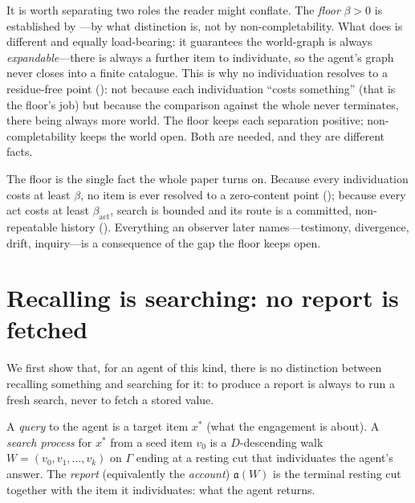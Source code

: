 \documentclass[11pt,twocolumn,a4paper]{article}
\newcommand{\Gph}{\Gamma}
\newcommand{\flo}{\beta}
\newcommand{\Walk}{W}
\newcommand{\acct}{\mathfrak{a}}   %
\newcommand{\dem}{D}
\begin{document}
\begin{remark}
\label{rem:noncompletable-role}
It is worth separating two roles the reader might conflate. The
\emph{floor} $\flo>0$ is established by ---by what
distinction is, not by non-completability. What
 does is different and equally load-bearing: it
guarantees the world-graph is always \emph{expandable}---there is always a
further item to individuate, so the agent's graph never closes into a finite
catalogue. This is why no individuation resolves to a residue-free point
(): not because each individuation ``costs something''
(that is the floor's job) but because the comparison against the whole never
terminates, there being always more world. The floor keeps each separation
positive; non-completability keeps the world open. Both are needed, and they
are different facts.
\end{remark}

\begin{remark}
\label{rem:floormatters}
The floor is the single fact the whole paper turns on. Because every
individuation costs at least $\flo$, no item is ever resolved to a
zero-content point (); because every act costs at least
$\flo_{\mathrm{act}}$, search is bounded and its route is a committed,
non-repeatable history (). Everything an observer later
names---testimony, divergence, drift, inquiry---is a consequence of the
gap the floor keeps open.
\end{remark}

\section{Recalling is searching: no report is fetched}
\label{sec:searchknowing}

We first show that, for an agent of this kind, there is no distinction
between recalling something and searching for it: to produce a report is
always to run a fresh search, never to fetch a stored value.

\begin{definition}
\label{def:searchprocess}
A \emph{query} to the agent is a target item $x^\ast$ (what the engagement
is about). A \emph{search process} for $x^\ast$ from a seed item $v_0$ is a
$\dem$-descending walk $\Walk=(v_0,v_1,\dots,v_k)$ on $\Gph$ ending at a
resting cut that individuates the agent's answer. The \emph{report}
(equivalently the \emph{account}) $\acct(\Walk)$ is the terminal resting
cut together with the item it individuates: what the agent returns.
\end{definition}
\end{document}
